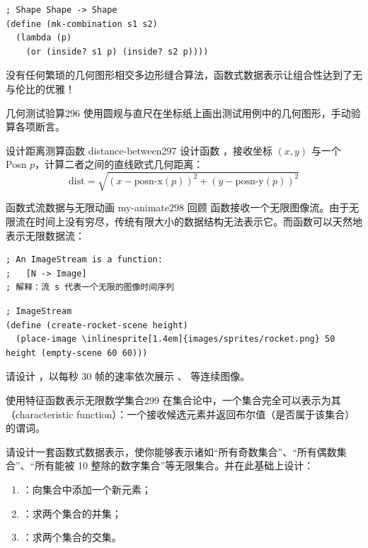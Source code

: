 \begin{lstlisting}[language=BSL]
; Shape Shape -> Shape
(define (mk-combination s1 s2)
  (lambda (p)
    (or (inside? s1 p) (inside? s2 p))))
\end{lstlisting}

没有任何繁琐的几何图形相交多边形缝合算法，函数式数据表示让组合性达到了无与伦比的优雅！

\begin{exercise}{几何测试验算}{296}
使用圆规与直尺在坐标纸上画出测试用例中的几何图形，手动验算各项断言。
\end{exercise}

\begin{exercise}{设计距离测算函数 distance-between}{297}
设计函数 ，接收坐标 $(x, y)$ 与一个 Posn $p$，计算二者之间的直线欧式几何距离：
$$\text{dist} = \sqrt{(x - \text{posn-x}(p))^2 + (y - \text{posn-y}(p))^2}$$
\end{exercise}

\begin{exercise}{函数式流数据与无限动画 my-animate}{298}
回顾  函数接收一个无限图像流。由于无限流在时间上没有穷尽，传统有限大小的数据结构无法表示它。而函数可以天然地表示无限数据流：

\begin{lstlisting}[language=BSL]
; An ImageStream is a function:
;   [N -> Image]
; 解释：流 s 代表一个无限的图像时间序列
\end{lstlisting}

\begin{stepperbox}
\begin{Verbatim}[commandchars=\\\{\}, fontsize=\scriptsize]
; ImageStream
(define (create-rocket-scene height)
  (place-image \inlinesprite[1.4em]{images/sprites/rocket.png} 50 height (empty-scene 60 60)))
\end{Verbatim}
\end{stepperbox}

请设计 ，以每秒 30 帧的速率依次展示 、 等连续图像。
\end{exercise}

\begin{exercise}{使用特征函数表示无限数学集合}{299}
在集合论中，一个集合完全可以表示为其（characteristic function）：一个接收候选元素并返回布尔值（是否属于该集合）的谓词。

请设计一套函数式数据表示，使你能够表示诸如“所有奇数集合”、“所有偶数集合”、“所有能被 10 整除的数字集合”等无限集合。并在此基础上设计：
\begin{enumerate}
  \item {}：向集合中添加一个新元素；
  \item {}：求两个集合的并集；
  \item {}：求两个集合的交集。
\end{enumerate}
\end{exercise}


